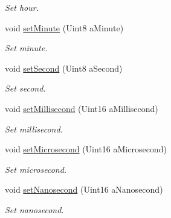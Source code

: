 \begin{DoxyCompactItemize}
\begin{DoxyCompactList}\small\item\em Set hour. \end{DoxyCompactList}\item 
void \hyperlink{classlibrary_1_1physics_1_1time_1_1_time_a62140a0b62a0d6264b4b1f65106e6d21}{set\+Minute} (Uint8 a\+Minute)
\begin{DoxyCompactList}\small\item\em Set minute. \end{DoxyCompactList}\item 
void \hyperlink{classlibrary_1_1physics_1_1time_1_1_time_add6193c6d0e3f4c0d9bdb78c1020fea2}{set\+Second} (Uint8 a\+Second)
\begin{DoxyCompactList}\small\item\em Set second. \end{DoxyCompactList}\item 
void \hyperlink{classlibrary_1_1physics_1_1time_1_1_time_a1813a36c2f988b97db039843201abc68}{set\+Millisecond} (Uint16 a\+Millisecond)
\begin{DoxyCompactList}\small\item\em Set millisecond. \end{DoxyCompactList}\item 
void \hyperlink{classlibrary_1_1physics_1_1time_1_1_time_a1cc4c14fc9e88909bca57724da4f5c46}{set\+Microsecond} (Uint16 a\+Microsecond)
\begin{DoxyCompactList}\small\item\em Set microsecond. \end{DoxyCompactList}\item 
void \hyperlink{classlibrary_1_1physics_1_1time_1_1_time_a2d941601ab94abc646d085e7958d1739}{set\+Nanosecond} (Uint16 a\+Nanosecond)
\begin{DoxyCompactList}\small\item\em Set nanosecond. \end{DoxyCompactList}\end{DoxyCompactItemize}
